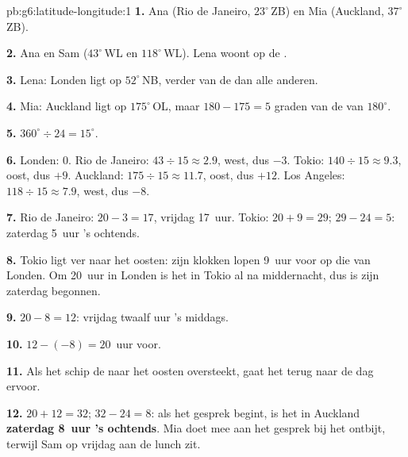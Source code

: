 \begin{solution}{pb:g6:latitude-longitude:1}
\textbf{1.} Ana (Rio de Janeiro, $23^\circ$\,ZB) en Mia (Auckland,
$37^\circ$\,ZB).

\textbf{2.} Ana en Sam ($43^\circ$\,WL en $118^\circ$\,WL). Lena woont op de
.

\textbf{3.} Lena: Londen ligt op $52^\circ$\,NB, verder van de  dan
alle anderen.

\textbf{4.} Mia: Auckland ligt op $175^\circ$\,OL, maar $180 - 175 = 5$
graden van de  van $180^\circ$.

\textbf{5.} $360^\circ \div 24 = 15^\circ$.

\textbf{6.} Londen: $0$. Rio de Janeiro: $43 \div 15 \approx 2.9$, west,
dus $-3$. Tokio: $140 \div 15 \approx 9.3$, oost, dus $+9$. Auckland:
$175 \div 15 \approx 11.7$, oost, dus $+12$. Los Angeles:
$118 \div 15 \approx 7.9$, west, dus $-8$.

\textbf{7.} Rio de Janeiro: $20 - 3 = 17$, vrijdag 17~uur. Tokio:
$20 + 9 = 29$; $29 - 24 = 5$: zaterdag 5~uur 's ochtends.

\textbf{8.} Tokio ligt ver naar het oosten: zijn klokken lopen 9~uur voor op
die van Londen. Om 20~uur in Londen is het in Tokio al na middernacht, dus
is zijn zaterdag begonnen.

\textbf{9.} $20 - 8 = 12$: vrijdag twaalf uur 's middags.

\textbf{10.} $12 - (-8) = 20$~uur voor.

\textbf{11.} Als het schip de  naar het oosten oversteekt, gaat
het terug naar de dag ervoor.

\textbf{12.} $20 + 12 = 32$; $32 - 24 = 8$: als het gesprek begint, is het
in Auckland \textbf{zaterdag 8~uur 's ochtends}. Mia doet mee aan het
gesprek bij het ontbijt, terwijl Sam op vrijdag aan de lunch zit.
\end{solution}
